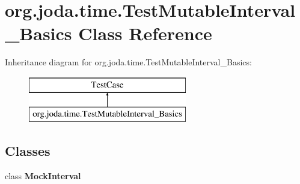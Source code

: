 \hypertarget{classorg_1_1joda_1_1time_1_1_test_mutable_interval___basics}{\section{org.\-joda.\-time.\-Test\-Mutable\-Interval\-\_\-\-Basics Class Reference}
\label{classorg_1_1joda_1_1time_1_1_test_mutable_interval___basics}
}
Inheritance diagram for org.\-joda.\-time.\-Test\-Mutable\-Interval\-\_\-\-Basics\-:\begin{figure}[H]
\begin{center}
\leavevmode
\includegraphics[height=2.000000cm]{classorg_1_1joda_1_1time_1_1_test_mutable_interval___basics}
\end{center}
\end{figure}
\subsection*{Classes}
\begin{DoxyCompactItemize}
\item 
class {\bfseries Mock\-Interval}
\end{DoxyCompactItemize}
